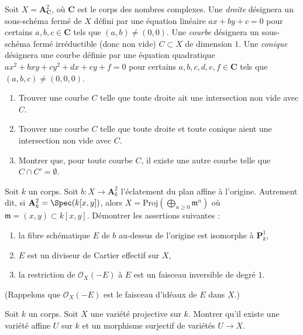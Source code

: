\begin{exercise}
\label{exercise-miss-curve}
Soit $X = \mathbf{A}^2_\mathbf{C}$, où $\mathbf{C}$ est le corps
des nombres complexes. Une {\it droite} désignera un
sous-schéma fermé de $X$ défini par une équation linéaire $ax + by + c = 0$ pour
certains $a, b, c \in \mathbf{C}$ tels que $(a, b) \not = (0, 0)$.
Une {\it courbe} désignera un sous-schéma fermé irréductible (donc non vide)
$C \subset X$ de dimension $1$.
Une {\it conique} désignera une courbe définie par une
équation quadratique $ax^2 + bxy + cy^2 + dx + ey + f = 0$
pour certains $a, b, c, d, e, f \in \mathbf{C}$ tels que
$(a, b, c) \not = (0, 0, 0)$.
\begin{enumerate}
\item Trouver une courbe $C$ telle que toute droite ait une intersection non vide avec $C$.
\item Trouver une courbe $C$ telle que toute droite et toute conique aient une
intersection non vide avec $C$.
\item Montrer que, pour toute courbe $C$, il existe une autre courbe
telle que $C \cap C' = \emptyset$.
\end{enumerate}
\end{exercise}

\begin{exercise}
\label{exercise-normal-bundle-exceptional-curve}
Soit $k$ un corps. Soit $b : X \to \mathbf{A}^2_k$ l'éclatement
du plan affine à l'origine. Autrement dit, si
$\mathbf{A}^2_k = \Spec(k[x, y])$, alors
$X = \text{Proj}(\bigoplus_{n \geq 0} \mathfrak m^n)$
où $\mathfrak m = (x, y) \subset k[x, y]$.
Démontrer les assertions suivantes :
\begin{enumerate}
\item la fibre schématique $E$ de $b$ au-dessus de l'origine
est isomorphe à $\mathbf{P}^1_k$,
\item $E$ est un diviseur de Cartier effectif sur $X$,
\item la restriction de $\mathcal{O}_X(-E)$
à $E$ est un faisceau inversible de degré $1$.
\end{enumerate}
(Rappelons que $\mathcal{O}_X(-E)$ est le faisceau d'idéaux de $E$ dans $X$.)
\end{exercise}

\begin{exercise}
\label{exercise-surjective-map-affine-variety-projective-variety}
Soit $k$ un corps. Soit $X$ une variété projective sur $k$.
Montrer qu'il existe une variété affine $U$ sur $k$ et un morphisme surjectif
de variétés $U \to X$.
\end{exercise}

